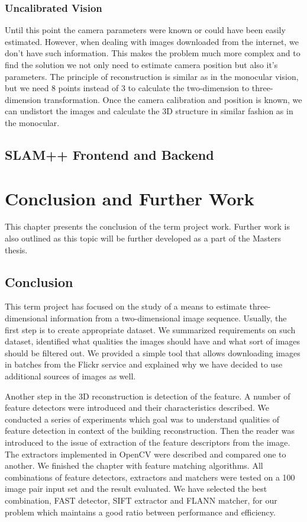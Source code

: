 \subsection*{Uncalibrated Vision}
Until this point the camera parameters were known or could have been easily estimated. However, when dealing with images downloaded from the internet, we don't have such information. This makes the problem much more complex and to find the solution we not only need to estimate camera position but also it's parameters. The principle of reconstruction is similar as in the monocular vision, but we need 8 points instead of 3 to calculate the two-dimension to three-dimension transformation. Once the camera calibration and position is known, we can undistort the images and calculate the 3D structure in similar fashion as in the monocular.

\section{SLAM++ Frontend and Backend}

\chapter{Conclusion and Further Work}
\label{chapter:conclusion}
This chapter presents the conclusion of the term project work. Further work is also outlined as this topic will be further developed as a part of the Masters thesis.

\section{Conclusion}
This term project has focused on the study of a means to estimate three-dimensional information from a two-dimensional image sequence. Usually, the first step is to create appropriate dataset. We summarized requirements on such dataset, identified what qualities the images should have and what sort of images should be filtered out. We provided a simple tool that allows downloading images in batches from the Flickr service and explained why we have decided to use additional sources of images as well. 

Another step in the 3D reconstruction is detection of the feature. A number of feature detectors were introduced and their characteristics described. We conducted a series of experiments which goal was to understand qualities of feature detection in context of the building reconstruction. Then the reader was introduced to the issue of extraction of the feature descriptors from the image. The extractors implemented in OpenCV were described and compared one to another. We finished the chapter with feature matching algorithms. All combinations of feature detectors, extractors and matchers were tested on a 100 image pair input set and the result evaluated. We have selected the best combination, FAST detector, SIFT extractor and FLANN matcher, for our problem which maintains a good ratio between performance and efficiency.


